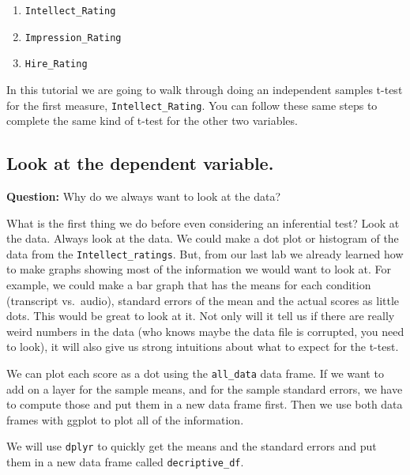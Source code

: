 \documentclass[
]{book}
\providecommand{\tightlist}{%
  \setlength{\itemsep}{0pt}\setlength{\parskip}{0pt}}
\begin{document}
\begin{enumerate}
\def\labelenumi{\arabic{enumi}.}
\tightlist
\item
  \texttt{Intellect\_Rating}
\item
  \texttt{Impression\_Rating}
\item
  \texttt{Hire\_Rating}
\end{enumerate}

In this tutorial we are going to walk through doing an independent samples t-test for the first measure, \texttt{Intellect\_Rating}. You can follow these same steps to complete the same kind of t-test for the other two variables.

\hypertarget{look-at-the-dependent-variable.}{%
\subsection{Look at the dependent variable.}\label{look-at-the-dependent-variable.}}

\textbf{Question:} Why do we always want to look at the data?

What is the first thing we do before even considering an inferential test? Look at the data. Always look at the data. We could make a dot plot or histogram of the data from the \texttt{Intellect\_ratings}. But, from our last lab we already learned how to make graphs showing most of the information we would want to look at. For example, we could make a bar graph that has the means for each condition (transcript vs.~audio), standard errors of the mean and the actual scores as little dots. This would be great to look at it. Not only will it tell us if there are really weird numbers in the data (who knows maybe the data file is corrupted, you need to look), it will also give us strong intuitions about what to expect for the t-test.

We can plot each score as a dot using the \texttt{all\_data} data frame. If we want to add on a layer for the sample means, and for the sample standard errors, we have to compute those and put them in a new data frame first. Then we use both data frames with ggplot to plot all of the information.

We will use \texttt{dplyr} to quickly get the means and the standard errors and put them in a new data frame called \texttt{decriptive\_df}.
\end{document}
